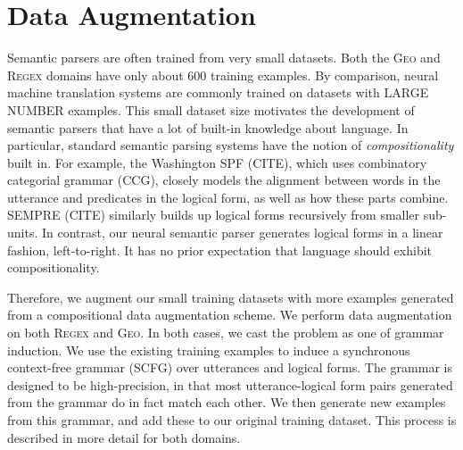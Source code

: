 \documentclass[11pt,letterpaper]{article}
\newcommand{\regex}{\textsc{Regex}\xspace}
\newcommand{\geo}{\textsc{Geo}\xspace}
\begin{document}
\section{Data Augmentation}
Semantic parsers are often trained from very small datasets.
Both the \geo and \regex domains have only about $600$ training examples.
By comparison, neural machine translation systems are commonly
trained on datasets with LARGE NUMBER examples.
This small dataset size motivates the development of semantic parsers
that have a lot of built-in knowledge about language.
In particular, standard semantic parsing systems have
the notion of \emph{compositionality} built in.
For example, the Washington SPF (CITE), 
which uses combinatory categorial grammar (CCG),
closely models the alignment between words in the utterance 
and predicates in the logical form, as well as how these parts
combine.  SEMPRE (CITE) similarly builds up logical forms
recursively from smaller sub-units.  In contrast,
our neural semantic parser generates logical forms in a linear fashion,
left-to-right.  It has no prior expectation that language should
exhibit compositionality.

Therefore, we augment our small training datasets with 
more examples generated from a compositional data augmentation scheme.
We perform data augmentation on both \regex and \geo.
In both cases, we cast the problem as one of grammar induction.
We use the existing training examples to induce a
synchronous context-free grammar (SCFG) over utterances and logical forms.
The grammar is designed to be high-precision, 
in that most utterance-logical form pairs generated from the grammar
do in fact match each other.
We then generate new examples from this grammar,
and add these to our original training dataset.
This process is described in more detail for both domains.
\end{document}
